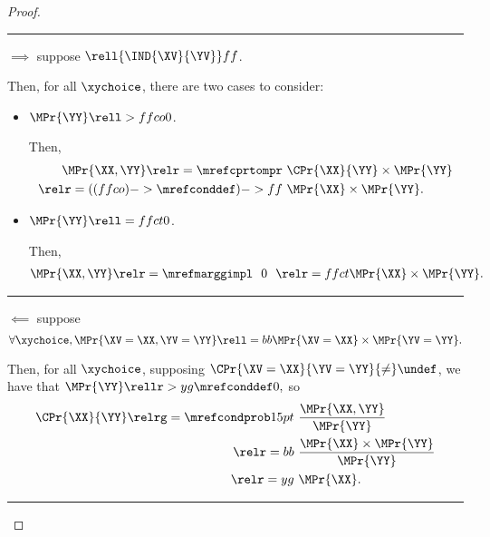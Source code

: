 \begin{proof}
  \hrule
  $\implies$ suppose $\rell {\IND{\XV}{\YV}} ff $.

  Then, for all $\xychoice$, there are two cases to consider:
  \begin{itemize}
    \item {} $\MPr{\YY} \rell > ffco 0$.

    Then,
    \begin{align*}
      \MPr{\XX, \YY}
      \relr = {\mrefcprtompr} &\ \CPr{\XX}{\YY} \times \MPr{\YY}\\
      \relr = {((ffco)->\mrefconddef)->ff} &\ \MPr{\XX} \times \MPr{\YY}.
    \end{align*}

    \item {} $\MPr{\YY} \rell = ffct 0$.

    Then,
    \begin{align*}
      \MPr{\XX, \YY} \relr = {\mrefmarggimpl} \ \ 0\ \ 
      \relr = ffct \MPr{\XX} \times \MPr{\YY}.
    \end{align*}
  \end{itemize}

  \hrule
  $\impliedby$ suppose 
  $$\forall \xychoice,
  \MPr{\XV = \XX, \YV = \YY} \rell = bb
  \MPr{\XV = \XX}
  \times
  \MPr{\YV = \YY}.$$

  Then, for all $\xychoice$, supposing $\CPr{\XV = \XX}{\YV = \YY} {\ne} \undef$, we have that
  $\MPr{\YY} \rellr > yg {\mrefconddef} 0,$
  so
  \begin{align*}
    \CPr{\XX}{\YY}
    \relrg = {\mrefcondprob} 15pt \ & 
    \frac{\MPr{\XX, \YY}}{\MPr{\YY}}
    \\
    \relr = bb \ & \frac{\MPr{\XX} \times \MPr{\YY}}{\MPr{\YY}}\\
    \relr = yg \ & \MPr{\XX}.
  \end{align*}
  \hrule
\end{proof}
